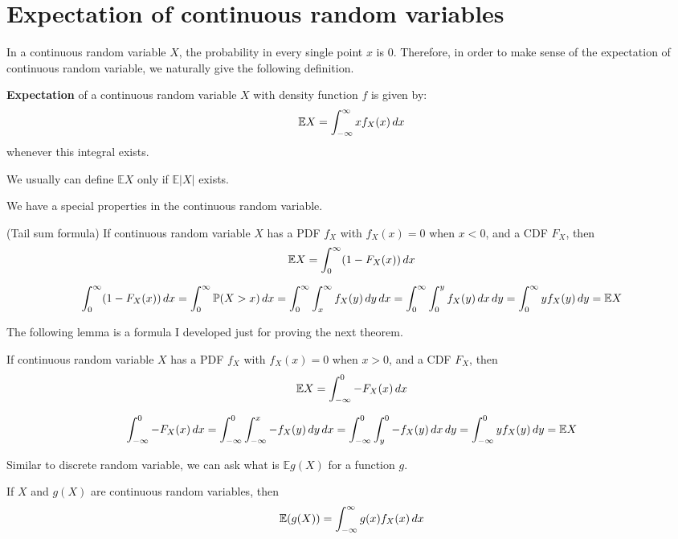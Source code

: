 \documentclass{huhtakm-template-book}
\newcommand{\prob}{\mathbb{P}}
\newcommand{\expect}{\mathbb{E}}
\begin{document}
\section{Expectation of continuous random variables}
In a continuous random variable $X$, the probability in every single point $x$ is $0$. Therefore, in order to make sense of the expectation of continuous random variable, we naturally give the following definition.
\begin{defn}
	\textbf{Expectation} of a continuous random variable $X$ with density function $f$ is given by:
	\begin{equation*}
		\expect X=\intinfty xf_{X}(x)\,dx
	\end{equation*}
	whenever this integral exists.
\end{defn}
\begin{rem}
	We usually can define $\expect X$ only if $\expect|X|$ exists.
\end{rem}
We have a special properties in the continuous random variable.
\begin{lem}(Tail sum formula)
	\label{Chapter 5 (Lemma) Tail sum formula}
	If continuous random variable $X$ has a PDF $f_{X}$ with $f_{X}(x)=0$ when $x<0$, and a CDF $F_{X}$, then
	\begin{equation*}
		\expect X=\intlu{0}{\infty}(1-F_{X}(x))\,dx
	\end{equation*}
\end{lem}
\begin{proofing}
	\begin{equation*}
		\intlu{0}{\infty}(1-F_{X}(x))\,dx=\intlu{0}{\infty}\prob(X>x)\,dx=\intlu{0}{\infty}\intlu{x}{\infty}f_{X}(y)\,dy\,dx=\intlu{0}{\infty}\intlu{0}{y}f_{X}(y)\,dx\,dy=\intlu{0}{\infty}yf_{X}(y)\,dy=\expect X
	\end{equation*}
\end{proofing}
The following lemma is a formula I developed just for proving the next theorem.
\begin{lem}
	\label{Chapter 5 (Lemma) Expectation as integral of CDF}
	If continuous random variable $X$ has a PDF $f_{X}$ with $f_{X}(x)=0$ when $x>0$, and a CDF $F_{X}$, then
	\begin{equation*}
		\expect X=\intlu{-\infty}{0}-F_{X}(x)\,dx
	\end{equation*}
\end{lem}
\begin{proofing}
	\begin{equation*}
		\intlu{-\infty}{0}-F_{X}(x)\,dx=\intlu{-\infty}{0}\intlu{-\infty}{x}-f_{X}(y)\,dy\,dx=\intlu{-\infty}{0}\intlu{y}{0}-f_{X}(y)\,dx\,dy=\intlu{-\infty}{0}yf_{X}(y)\,dy=\expect X
	\end{equation*}
\end{proofing}
Similar to discrete random variable, we can ask what is $\expect g(X)$ for a function $g$.
\begin{thm}
	\label{Chapter 5 (Theorem) Expectation of function of continuous random variable}
	If $X$ and $g(X)$ are continuous random variables, then
	\begin{equation*}
		\expect(g(X))=\intinfty g(x)f_{X}(x)\,dx
	\end{equation*}
\end{thm}
\end{document}
